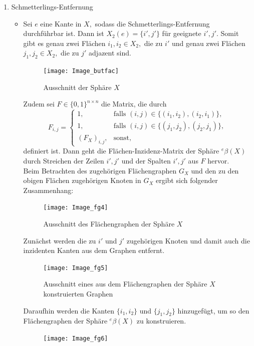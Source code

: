 \documentclass[12pt,titlepage,twoside,cleardoublepage]{article}
\theoremstyle{nummermitklammern}
\numberwithin{equation}{section}
\begin{document}
\begin{enumerate}
\item Schmetterlings-Entfernung
\begin{itemize}
\item Sei $e$ eine Kante in $X,$ sodass die Schmetterlings-Entfernung durchführbar ist. Dann ist $X_2(e)=\{i',j'\}$ für geeignete $i',j'.$ Somit gibt es genau zwei Flächen $i_1,i_2\in X_2,$ die zu $i'$ und genau zwei Flächen $j_1,j_2\in X_2,$ die zu $j'$ adjazent sind. 
\begin{figure}[H]
\begin{center}
\texttt{[image: Image\_butfac]}
\end{center}
\caption{Ausschnitt der Sphäre $X$}
\end{figure}
Zudem sei $F\in \{0,1\}^{n\times n}$ die Matrix, die durch
 \[
F_{i,j}=
\begin{cases}
1,&\text{falls }(i,j)\in \{(i_1,i_2),(i_2,i_1)\},\\
1,&\text{falls }(i,j)\in \{(j_1,j_2),(j_2,j_1)\}, \\
(F_{X})_{i,j},& \text{sonst},
\end{cases}
\] definiert ist. Dann geht die Flächen-Inzidenz-Matrix der Sphäre ${}^e\beta(X)$ durch Streichen der Zeilen $i',j'$ und der Spalten $i',j'$ aus $F$ hervor.\\
Beim Betrachten des zugehörigen Flächengraphen $G_X$ und den zu den obigen Flächen zugehörigen Knoten in $G_X$ ergibt sich folgender Zusammenhang:
\begin{figure}[H]
\begin{center}
\texttt{[image: Image\_fg4]}
\end{center}
\caption{Ausschnitt des Flächengraphen der Sphäre $X$}
\end{figure}
Zunächst werden die zu $i'$ und $j'$ zugehörigen Knoten und damit auch die inzidenten Kanten aus dem Graphen entfernt. 
\begin{figure}[H]
\begin{center}
\texttt{[image: Image\_fg5]}
\end{center}
\caption{Ausschnitt eines aus dem Flächengraphen der Sphäre $X$ konstruierten Graphen}
\end{figure}
Daraufhin werden die Kanten $\{i_1,i_2\}$ und $\{j_1,j_2\}$ hinzugefügt, um so den Flächengraphen der Sphäre ${}^e\beta(X)$ zu konstruieren. 
\begin{figure}[H]
\begin{center}
\texttt{[image: Image\_fg6]}
\end{center}

\end{figure}
\end{itemize}
\end{enumerate}
\end{document}
